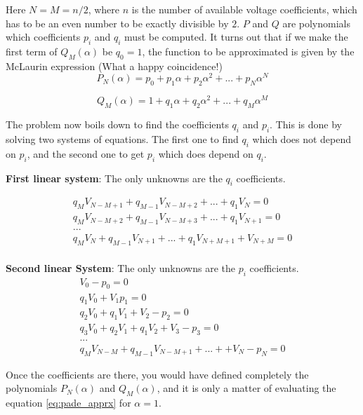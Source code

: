 \documentclass[11pt,fleqn]{book} %
\begin{document}
Here $N=M=n/2$, where $n$ is the number of available voltage coefficients, which has to be an even number to be exactly divisible by $2$. $P$ and $Q$ are polynomials which coefficients $p_i$ and $q_i$ must be computed. It turns out that if we make the first term of $Q_M(\alpha)$ be $q_0=1$, the function to be approximated is given by the McLaurin expression (What a happy coincidence!)
\begin{equation}
P_N(\alpha) = p_0 + p_1\alpha + p_2\alpha^2 + ... + p_N\alpha^N
\end{equation}

\begin{equation}
Q_M(\alpha) = 1 + q_1\alpha + q_2\alpha^2 + ... + q_M\alpha^M
\end{equation}



The problem now boils down to find the coefficients $q_i$ and $p_i$. This is done by solving two systems of equations. The first one to find $q_i$ which does not depend on $p_i$, and the second one to get $p_i$ which does depend on $q_i$.

\textbf{First linear system}: The only unknowns are the $q_i$ coefficients.

\begin{equation}
\begin{matrix}
q_M V_{N-M+1} + q_{M-1}V_{N-M+2}+...+q_1V_N = 0\\
q_M V_{N-M+2} + q_{M-1}V_{N-M+3}+...+q_1V_{N+1} = 0\\
...\\
q_M V_{N} + q_{M-1}V_{N+1}+...+q_1V_{N+M+1} + V_{N+M} = 0\\
\end{matrix}
\end{equation}

\textbf{Second linear System}: The only unknowns are the $p_i$ coefficients.
\begin{equation}
\begin{matrix}
V_0 - p_0=0\\
q_1V_0 + V_1  p_1=0\\
q_2V_0 + q_1V_1+V_2-p_2=0\\
q_3V_0 + q_2V_1 + q_1V_2 + V_3 - p_3 = 0\\
...\\
q_MV_{N-M} + q_{M-1}V_{N-M+1} + ... + +V_N - p_N=0
\end{matrix}
\end{equation}

Once the coefficients are there, you would have defined completely the polynomials $P_N(\alpha)$ and $Q_M(\alpha)$, and it is only a matter of evaluating the equation \ref{eq:pade_apprx} for $\alpha=1$.\newline
\end{document}
